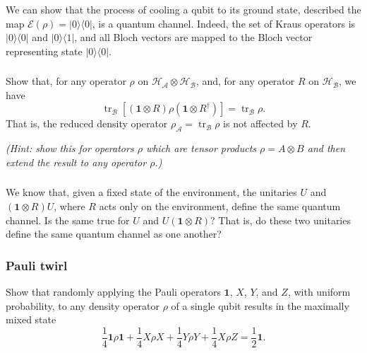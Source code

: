 \documentclass[fleqn]{article}
\begin{document}
\hypertarget{section-35}{%
\subsubsection{}\label{section-35}}

We can show that the process of cooling a qubit to its ground state, described the map \(\mathcal{E}(\rho)=|0\rangle\langle 0|\), is a quantum channel.
Indeed, the set of Kraus operators is \(|0\rangle\langle 0|\) and \(|0\rangle\langle 1|\), and all Bloch vectors are mapped to the Bloch vector representing state \(|0\rangle\langle 0|\).

\hypertarget{section-36}{%
\subsubsection{}\label{section-36}}

Show that, for any operator \(\rho\) on \(\mathcal{H}_\mathcal{A}\otimes\mathcal{H}_\mathcal{B}\), and, for any operator \(R\) on \(\mathcal{H}_\mathcal{B}\), we have
\[
  \operatorname{tr}_\mathcal{B} \left[(\mathbf{1}\otimes R) \rho (\mathbf{1}\otimes R^\dagger)\right]
  = \operatorname{tr}_\mathcal{B} \rho.
\]
That is, the reduced density operator \(\rho_\mathcal{A}=\operatorname{tr}_\mathcal{B} \rho\) is not affected by \(R\).

\emph{(Hint: show this for operators \(\rho\) which are tensor products \(\rho=A\otimes B\) and then extend the result to any operator \(\rho\).)}

\hypertarget{section-37}{%
\subsubsection{}\label{section-37}}

We know that, given a fixed state of the environment, the unitaries \(U\) and \((\mathbf{1}\otimes R)U\), where \(R\) acts only on the environment, define the same quantum channel.
Is the same true for \(U\) and \(U(\mathbf{1}\otimes R)\)?
That is, do these two unitaries define the same quantum channel as one another?

\hypertarget{pauli-twirl}{%
\subsubsection{Pauli twirl}\label{pauli-twirl}}

Show that randomly applying the Pauli operators \(\mathbf{1}\), \(X\), \(Y\), and \(Z\), with uniform probability, to any density operator \(\rho\) of a single qubit results in the maximally mixed state
\[
  \frac{1}{4} \mathbf{1}\rho\mathbf{1}+\frac{1}{4} X\rho X + \frac{1}{4} Y\rho Y + \frac{1}{4} X\rho Z
  = \frac{1}{2}\mathbf{1}.
\]
\end{document}
